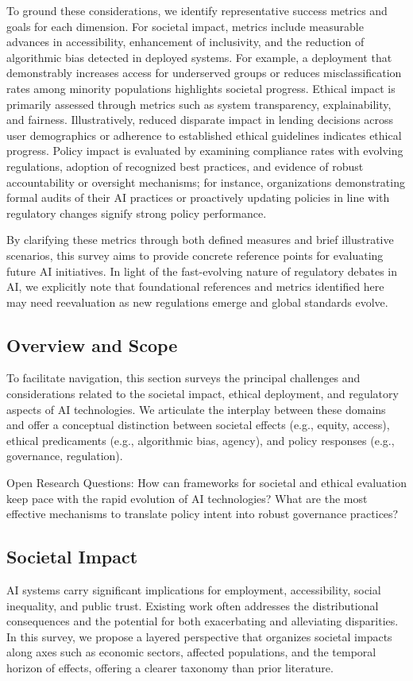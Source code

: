 \documentclass[sigconf]{acmart}
\begin{document}
To ground these considerations, we identify representative success metrics and goals for each dimension. For societal impact, metrics include measurable advances in accessibility, enhancement of inclusivity, and the reduction of algorithmic bias detected in deployed systems. For example, a deployment that demonstrably increases access for underserved groups or reduces misclassification rates among minority populations highlights societal progress. Ethical impact is primarily assessed through metrics such as system transparency, explainability, and fairness. Illustratively, reduced disparate impact in lending decisions across user demographics or adherence to established ethical guidelines indicates ethical progress. Policy impact is evaluated by examining compliance rates with evolving regulations, adoption of recognized best practices, and evidence of robust accountability or oversight mechanisms; for instance, organizations demonstrating formal audits of their AI practices or proactively updating policies in line with regulatory changes signify strong policy performance.

By clarifying these metrics through both defined measures and brief illustrative scenarios, this survey aims to provide concrete reference points for evaluating future AI initiatives. In light of the fast-evolving nature of regulatory debates in AI, we explicitly note that foundational references and metrics identified here may need reevaluation as new regulations emerge and global standards evolve.

\subsection{Overview and Scope}
To facilitate navigation, this section surveys the principal challenges and considerations related to the societal impact, ethical deployment, and regulatory aspects of AI technologies. We articulate the interplay between these domains and offer a conceptual distinction between societal effects (e.g., equity, access), ethical predicaments (e.g., algorithmic bias, agency), and policy responses (e.g., governance, regulation).

Open Research Questions: How can frameworks for societal and ethical evaluation keep pace with the rapid evolution of AI technologies? What are the most effective mechanisms to translate policy intent into robust governance practices?

\subsection{Societal Impact}
AI systems carry significant implications for employment, accessibility, social inequality, and public trust. Existing work often addresses the distributional consequences and the potential for both exacerbating and alleviating disparities. In this survey, we propose a layered perspective that organizes societal impacts along axes such as economic sectors, affected populations, and the temporal horizon of effects, offering a clearer taxonomy than prior literature.
\end{document}
